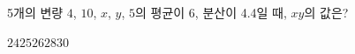 5개의 변량 $4$, $10$, $x$, $y$, $5$의 평균이 6, 분산이 4.4일 때, $xy$의 값은?
\begin{choices32}{$24$}{$25$}{$26$}{$28$}{$30$}\end{choices32}
